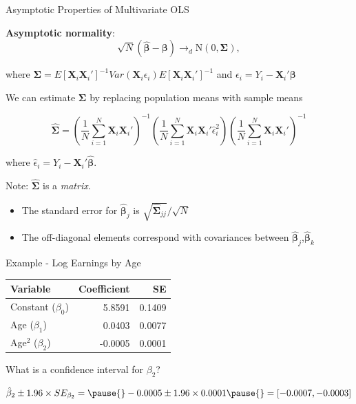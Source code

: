 \documentclass[11pt,english,handout]{beamer}
\newenvironment{wideitemize}{\itemize\addtolength{\itemsep}{10pt}}{\enditemize}
\begin{document}
	\begin{frame}{Asymptotic Properties of Multivariate OLS} 
		\begin{wideitemize}
			\item
			\textbf{Asymptotic normality}:
			$$\sqrt{N} (\bm{\hat\beta} - \bm{\beta}) \rightarrow_d \mathrm{N}(0, \bm{\Sigma}),$$
			
			\noindent where $\bm{\Sigma} = E[ \bm{X}_i \bm{X}_i' ]^{-1} Var( \bm{X}_i \epsilon_i  )	E[ \bm{X}_i \bm{X}_i' ]^{-1} $ and $\epsilon_i = Y_i - \bm{X}_i' \bm{\beta}$
			
			
			\pause
			\item 
			We can estimate $\bm{\Sigma}$ by replacing population means with sample means	
			
			$$\bm{\hat\Sigma} = \left( \frac{1}{N} \sum_{i=1}^N \bm{X}_i \bm{X}_i' \right)^{-1} \left(\frac{1}{N} \sum_{i=1}^N \bm{X}_i \bm{X}_i' \hat\epsilon_i^2  \right) \left( \frac{1}{N} \sum_{i=1}^N \bm{X}_i \bm{X}_i' \right)^{-1}  $$
			
			where  $\hat\epsilon_i = Y_i - \bm{X}_i' \bm{\hat\beta}$.
			
			
			\item\pause{}
			Note: $\bm{\hat\Sigma}$ is a \textit{matrix}. 
				\begin{itemize}
					\item 
					The standard error for $\bm{\hat\beta}_j$ is $\sqrt{\bm{\hat\Sigma}_{jj}} / \sqrt{N}$
					
					\item
					The off-diagonal elements correspond with covariances between $\bm{\hat\beta}_j$,$\bm{\hat\beta}_k$
				\end{itemize}
			
		\end{wideitemize}
	\end{frame}

	\begin{frame}{Example - Log Earnings by Age} 
		
		\begin{tabular}{lrr}
			Variable & Coefficient & SE \\ \hline
			Constant ($\beta_0$) & 5.8591 & 0.1409 \\
			Age ($\beta_1$) & 0.0403 &  0.0077\\
			Age$^2$ ($\beta_2$) & -0.0005 & 0.0001
		\end{tabular}
\medskip
		
		
		\begin{wideitemize}
			\item
			What is a confidence interval for $\beta_2$? 
			
			\pause{}
			$$\hat\beta_2 \pm 1.96 \times SE_{\beta_2} = \pause{} -0.0005 \pm 1.96 \times 0.0001 \pause{} = [-0.0007, -0.0003]  $$
		\end{wideitemize}
	\end{frame}
\end{document}
